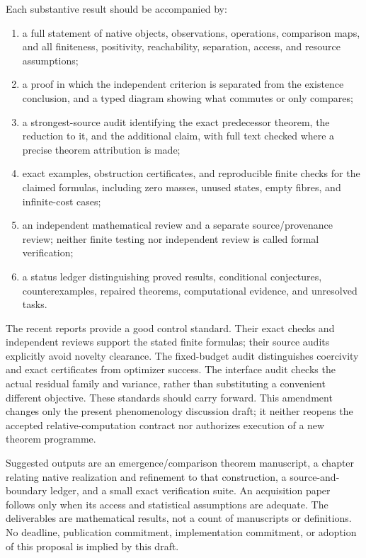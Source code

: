 \documentclass[11pt]{article}
\theoremstyle{remark}
\begin{document}
Each substantive result should be accompanied by:
\begin{enumerate}
\item a full statement of native objects, observations, operations, comparison maps, and all finiteness, positivity, reachability, separation, access, and resource assumptions;
\item a proof in which the independent criterion is separated from the existence conclusion, and a typed diagram showing what commutes or only compares;
\item a strongest-source audit identifying the exact predecessor theorem, the reduction to it, and the additional claim, with full text checked where a precise theorem attribution is made;
\item exact examples, obstruction certificates, and reproducible finite checks for the claimed formulas, including zero masses, unused states, empty fibres, and infinite-cost cases;
\item an independent mathematical review and a separate source/provenance review; neither finite testing nor independent review is called formal verification;
\item a status ledger distinguishing proved results, conditional conjectures, counterexamples, repaired theorems, computational evidence, and unresolved tasks.
\end{enumerate}

The recent reports provide a good control standard. Their exact checks and independent reviews support the stated finite formulas; their source audits explicitly avoid novelty clearance. The fixed-budget audit distinguishes coercivity and exact certificates from optimizer success. The interface audit checks the actual residual family and variance, rather than substituting a convenient different objective. These standards should carry forward. This amendment changes only the present phenomenology discussion draft; it neither reopens the accepted relative-computation contract nor authorizes execution of a new theorem programme.

Suggested outputs are an emergence/comparison theorem manuscript, a chapter relating native realization and refinement to that construction, a source-and-boundary ledger, and a small exact verification suite. An acquisition paper follows only when its access and statistical assumptions are adequate. The deliverables are mathematical results, not a count of manuscripts or definitions. No deadline, publication commitment, implementation commitment, or adoption of this proposal is implied by this draft.
\end{document}
